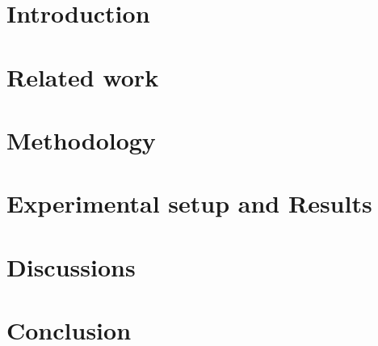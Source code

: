 \documentclass[MACS,english,a4paper,oneside]{ntnuthesis/ntnuthesis}
\begin{document}
	
	\makefrontpages %
	
	
	
	\tableofcontents
	
	\hypersetup{pageanchor=true}
	
	\listoffigures
	\listoftables
	
	
	\chapter{Introduction}
	 
	
	\chapter{Related work}
	 
	
	\chapter{Methodology}
	 
	
	\chapter{Experimental setup and Results}
	 
	
	\chapter{Discussions}
	 
	
	\chapter{Conclusion}
	 
	
	
	\clearpage
	\printbibliography
	
	
\end{document}

